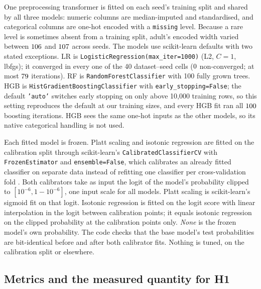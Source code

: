 \documentclass[11pt]{article}
\newcommand{\ds}[1]{\textsf{#1}}
\newcommand{\ad}{\ds{adult}}
\begin{document}
One preprocessing transformer is fitted on each seed's training split and shared by all three
models: numeric columns are median-imputed and standardised, and categorical columns are
one-hot encoded with a \texttt{missing} level. Because a rare level is sometimes absent from a
training split, \ad's encoded width varied between $106$ and $107$ across
seeds. The models use scikit-learn defaults with two
stated exceptions. LR is \texttt{LogisticRegression(max\_iter=1000)} (L2, $C=1$, lbfgs); it
converged in every one of the 40 dataset--seed cells ($0$ non-converged; at most
$79$ iterations). RF is \texttt{RandomForestClassifier} with 100 fully grown trees.
HGB is \texttt{HistGradientBoostingClassifier} with \texttt{early\_stopping=False}; the default
\texttt{'auto'} switches early stopping on only above 10,000 training rows, so this setting
reproduces the default at our training sizes, and every HGB fit ran all $100$
boosting iterations. HGB sees the same one-hot inputs as the other models, so its native
categorical handling is not used.

Each fitted model is frozen. Platt scaling and isotonic regression are fitted on the
calibration split through scikit-learn's \texttt{CalibratedClassifierCV} with
\texttt{FrozenEstimator} and \texttt{ensemble=False}, which calibrates an already fitted
classifier on separate data instead of refitting one classifier per cross-validation fold
\citep{sklearn_calibration_docs}. Both calibrators take as input the logit of the model's
probability clipped to $[10^{-6}, 1-10^{-6}]$, one input scale for all models. Platt scaling
is scikit-learn's sigmoid fit on that logit. Isotonic regression is fitted on the logit score
with linear interpolation in the logit between calibration points; it equals isotonic
regression on the clipped probability at the calibration points only. \emph{None} is the
frozen model's own probability. The code checks that the base model's test probabilities are
bit-identical before and after both calibrator fits. Nothing is tuned, on the calibration
split or elsewhere.

\subsection{Metrics and the measured quantity for H1}
\label{sec:metrics}
\end{document}
